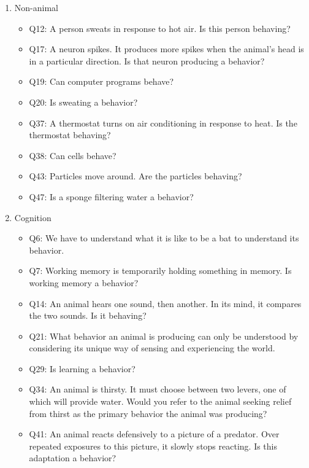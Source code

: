 \begin{enumerate}
 \item Non-animal
\begin{itemize}[label={}]
\item Q12: A person sweats in response to hot air. Is this person behaving?
\item Q17: A neuron spikes. It produces more spikes when the animal’s head is in a particular direction. Is that neuron producing a behavior?
\item Q19: Can computer programs behave?
\item Q20: Is sweating a behavior?
\item Q37: A thermostat turns on air conditioning in response to heat. Is the thermostat behaving?
\item Q38: Can cells behave?
\item Q43: Particles move around. Are the particles behaving?
\item Q47: Is a sponge filtering water a behavior?
\end{itemize}
 \item Cognition
\begin{itemize}[label={}]
\item Q6: We have to understand what it is like to be a bat to understand its behavior.
\item Q7: Working memory is temporarily holding something in memory. Is working memory a behavior?
\item Q14: An animal hears one sound, then another. In its mind, it compares the two sounds. Is it behaving?
\item Q21: What behavior an animal is producing can only be understood by considering its unique way of sensing and experiencing the world.
\item Q29: Is learning a behavior?
\item Q34: An animal is thirsty. It must choose between two levers, one of which will provide water. Would you refer to the animal seeking relief from thirst as the primary behavior the animal was producing?
\item Q41: An animal reacts defensively to a picture of a predator. Over repeated exposures to this picture, it slowly stops reacting. Is this adaptation a behavior?
\end{itemize}
\end{enumerate}
